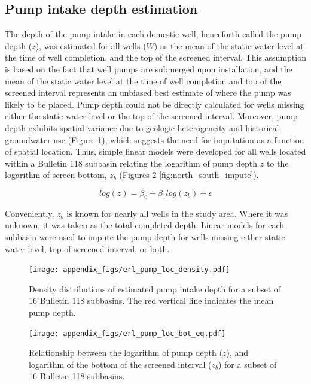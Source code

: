 \subsection{Pump intake depth estimation}
\label{ap_a_pump_depth}


The depth of the pump intake in each domestic well, henceforth called the pump depth ($z$), was estimated for all wells ($W$) as the mean of the static water level at the time of well completion, and the top of the screened interval. This assumption is based on the fact that well pumps are submerged upon installation, and the mean of the static water level at the time of well completion and top of the screened interval represents an unbiased best estimate of where the pump was likely to be placed. Pump depth could not be directly calculated for wells missing either the static water level or the top of the screened interval. Moreover, pump depth exhibits spatial variance due to geologic heterogeneity and historical groundwater use (Figure \ref{fig:pump_loc_density}), which suggests the need for imputation as a function of spatial location. Thus, simple linear models were developed for all wells located within a Bulletin 118 subbasin relating the logarithm of pump depth $z$ to the logarithm of screen bottom, $z_{b}$ (Figures \ref{fig:pump_loc_bottom}-\ref{fig:north_south_impute}). 

\begin{equation}
  log(z) = \beta_{0} + \beta_{1}log(z_{b}) + \epsilon
\end{equation}

Conveniently, $z_{b}$ is known for nearly all wells in the study area. Where it was unknown, it was taken as the total completed depth. Linear models for each subbasin were used to impute the pump depth for wells missing either static water level, top of screened interval, or both.  

\begin{figure}
	\texttt{[image: appendix\_figs/erl\_pump\_loc\_density.pdf]}
	\caption{Density distributions of estimated pump intake depth for a subset of 16 Bulletin 118 subbasins. The red vertical line indicates the mean pump depth.}
	\label{fig:pump_loc_density}
\end{figure}

\begin{figure}[ht]
	\texttt{[image: appendix\_figs/erl\_pump\_loc\_bot\_eq.pdf]}
	\caption{Relationship between the logarithm of pump depth ($z$), and logarithm of the bottom of the screened interval ($z_{b}$) for a subset of 16 Bulletin 118 subbasins.}
	\label{fig:pump_loc_bottom}
\end{figure}

